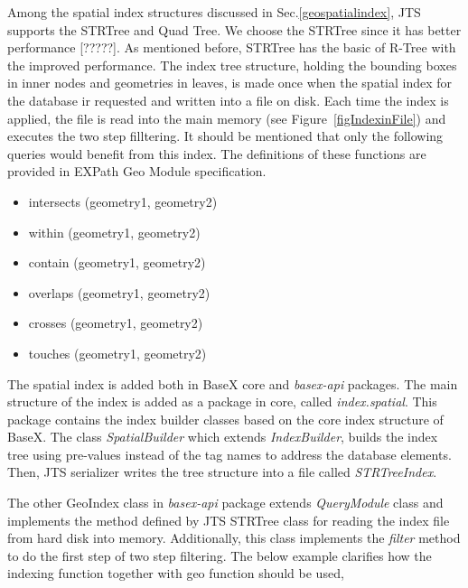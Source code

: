 \documentclass[a4paper,12pt]{article}
\begin{document}
Among the spatial index structures discussed in Sec.\ref{geospatialindex},  JTS supports the STRTree and Quad Tree. We choose the STRTree since it has better performance [?????]. As mentioned before, STRTree has the basic of R-Tree with the improved performance. The index tree structure, holding the bounding boxes in inner nodes and geometries in leaves, is made once when the spatial index for the database ir requested and written into a file on disk. Each time the index is applied, the file is read into the main memory (see Figure~\ref{figIndexinFile}) and executes the two step filltering. It should be mentioned that only the following queries would benefit from this index. The definitions of these functions are provided in EXPath Geo Module specification.
\begin{itemize}
\item intersects (geometry1, geometry2)
\item within (geometry1, geometry2)
\item contain (geometry1, geometry2)
\item overlaps (geometry1, geometry2)
\item crosses (geometry1, geometry2)
\item touches (geometry1, geometry2)
\end{itemize}

The spatial index is added both in BaseX core and \textit{basex-api} packages. The main structure of the index is added as a package in core, called \textit{index.spatial}. This package contains the index builder classes based on the core index structure of BaseX. The class \textit{SpatialBuilder} which extends \textit{IndexBuilder}, builds the index tree using pre-values instead of the tag names to address the database elements. Then,  JTS serializer writes the tree structure  into a file called \textit{STRTreeIndex}.

The other GeoIndex class in \textit{basex-api} package extends \textit{QueryModule} class and implements the method defined by JTS STRTree class for reading the index file from hard disk into memory. Additionally, this class implements the \textit{filter} method to do the first step of two step filtering.   
The below example clarifies how the indexing function together with geo function should be used, 
\end{document}
